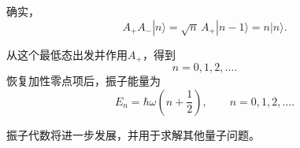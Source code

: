 确实，
\begin{equation}
A_+A_-|n\rangle
=\sqrt n\,A_+|n-1\rangle
=n|n\rangle.
\end{equation}

\begin{classroomqa}
\end{classroomqa}


从这个最低态出发并作用\(A_+\)，得到
\begin{equation}
n=0,1,2,\ldots.
\end{equation}
恢复加性零点项后，振子能量为
\begin{equation}
E_n=\hbar\omega\left(n+\frac{1}{2}\right),
\qquad n=0,1,2,\ldots.
\end{equation}

振子代数将进一步发展，并用于求解其他量子问题。
